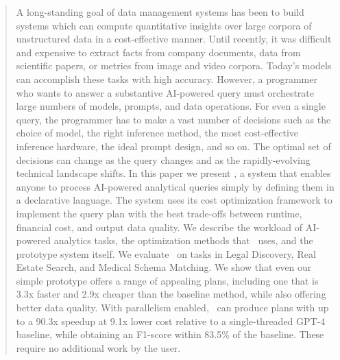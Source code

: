 \begin{abstract}
A long-standing goal of data management systems has been to build systems which can compute quantitative insights over large corpora of unstructured data in a cost-effective manner. Until recently, it was difficult and expensive to extract facts from company documents, data from scientific papers, or metrics from image and video corpora. Today's models can accomplish these tasks with high accuracy. However, a programmer who wants to answer a substantive AI-powered query must orchestrate large numbers of models, prompts, and data operations. For even a single query, the programmer has to make a vast number of decisions such as the choice of model, the right inference method, the most cost-effective inference hardware, the ideal prompt design, and so on. The optimal set of decisions can change as the query changes and as the rapidly-evolving technical landscape shifts. In this paper we present \system, a system that enables anyone to process AI-powered analytical queries simply by defining them in a declarative language. The system uses its cost optimization framework to implement the query plan with the best trade-offs between runtime, financial cost, and output data quality.  We describe the workload of AI-powered analytics tasks, the optimization methods that \system\ uses, and the prototype system itself. We evaluate \system\ on tasks in Legal Discovery, Real Estate Search, and Medical Schema Matching. We show that even our simple prototype offers a range of appealing plans, including one that is 3.3x faster and 2.9x cheaper than the baseline method, while also offering better data quality. With parallelism enabled, \system\ can produce plans with up to a 90.3x speedup at 9.1x lower cost relative to a single-threaded GPT-4 baseline, while obtaining an F1-score within 83.5\% of the baseline. These require no additional work by the user.
\end{abstract}


